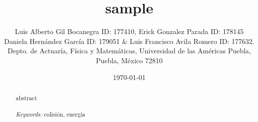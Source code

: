 \documentclass{article}
\begin{document}

\renewcommand{\footrulewidth}{1pt}
\renewcommand{\tablename}{Tabla}
\renewcommand{\figurename}{Figura}


\title{sample}
\author{\small{Luis Alberto Gil Bocanegra ID: 177410, Erick Gonzalez Parada ID: 178145}\\
 \small{Daniela Hernández García ID: 179051 $\&$ Luis Francisco Avila Romero ID: 177632.}\\		%
	   \small{Depto. de Actuaría, Física y Matemáticas, Universidad de las Américas Puebla, Puebla, M\'exico 72810}}
\date{\small{\today}}

\maketitle


\begin{abstract}
	abstract
\\
\\
{\it Keywords:}  colisión, energía  
\\
\\
\end{abstract}

\end{document}
